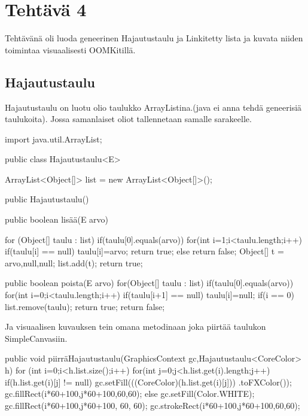
\chapter{Tehtävä 4 \label{chap:Teht=0000E4v=0000E4-4}}

Tehtävänä oli luoda geneerinen Hajautustaulu ja Linkitetty lista ja kuvata niiden toimintaa visuaalisesti 
OOMKitillä. 

\section{Hajautustaulu}

\label{Hajautustaulu}

Hajautustaulu on luotu olio taulukko ArrayListina.(java ei anna tehdä geneerisiä taulukoita). 
Jossa samanlaiset oliot tallennetaan samalle sarakeelle. 
\label{Hajautustaulu}
\begin{javacode}
import java.util.ArrayList;


public class Hajautustaulu<E> {
	ArrayList<Object[]> list = new ArrayList<Object[]>();
	
	public Hajautustaulu() {
		 
	}
	public boolean lisää(E arvo) {
		for (Object[] taulu : list) {
			if(taulu[0].equals(arvo)) {
				for(int i=1;i<taulu.length;i++) {
					if(taulu[i] == null) {
						taulu[i]=arvo;
						return true;
					}else {
						return false;
					}
				}
			}
		}
		Object[] t = {arvo,null,null};
		list.add(t);
		return true;
		
	}
	public boolean poista(E arvo) {
		for(Object[] taulu : list) {
			if(taulu[0].equals(arvo)) {
				for(int i=0;i<taulu.length;i++) {
					if(taulu[i+1] == null) {
						taulu[i]=null;
						if(i == 0) {
							list.remove(taulu);
						}
						return true;
					}
				}
			}
		}
		return false;
	}
	
	
}

\end{javacode}

Ja visuaalisen kuvauksen tein omana metodinaan joka piirtää taulukon SimpleCanvasiin. 

\begin{javacode}
 public void piirräHajautustaulu(GraphicsContext gc,Hajautustaulu<CoreColor> h) {
            	for (int i=0;i<h.list.size();i++) {
           			for(int j=0;j<h.list.get(i).length;j++) {
           				if(h.list.get(i)[j] != null) {
           					gc.setFill(((CoreColor)(h.list.get(i)[j]))
                                                                  .toFXColor());
            				gc.fillRect(i*60+100,j*60+100,60,60);
           				}else {
        					gc.setFill(Color.WHITE);
        					gc.fillRect(i*60+100,j*60+100, 60, 60);
        				}
        				gc.strokeRect(i*60+100,j*60+100,60,60);
        			}
        		}
           	}

\end{javacode}

